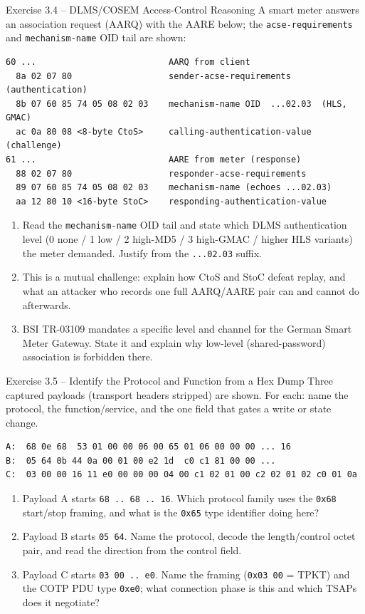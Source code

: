 \documentclass[11pt,a4paper]{article}
\begin{document}
\begin{taskbox}{Exercise 3.4 -- DLMS/COSEM Access-Control Reasoning}
A smart meter answers an association request (AARQ) with the AARE below; the
\texttt{acse-requirements} and \texttt{mechanism-name} OID tail are shown:
\begin{lstlisting}[language={}]
60 ...                          AARQ from client
  8a 02 07 80                   sender-acse-requirements (authentication)
  8b 07 60 85 74 05 08 02 03    mechanism-name OID  ...02.03  (HLS, GMAC)
  ac 0a 80 08 <8-byte CtoS>     calling-authentication-value (challenge)
61 ...                          AARE from meter (response)
  88 02 07 80                   responder-acse-requirements
  89 07 60 85 74 05 08 02 03    mechanism-name (echoes ...02.03)
  aa 12 80 10 <16-byte StoC>    responding-authentication-value
\end{lstlisting}
\begin{enumerate}
  \item Read the \texttt{mechanism-name} OID tail and state which DLMS
        authentication level (0 none / 1 low / 2 high-MD5 / 3 high-GMAC /
        higher HLS variants) the meter demanded. Justify from the
        \texttt{...02.03} suffix.
  \item This is a mutual challenge: explain how CtoS and StoC defeat replay,
        and what an attacker who records one full AARQ/AARE pair can and
        cannot do afterwards.
  \item BSI TR-03109 mandates a specific level and channel for the German
        Smart Meter Gateway. State it and explain why low-level
        (shared-password) association is forbidden there.
\end{enumerate}
\end{taskbox}

\begin{taskbox}{Exercise 3.5 -- Identify the Protocol and Function from a Hex Dump}
Three captured payloads (transport headers stripped) are shown. For each:
name the protocol, the function/service, and the one field that gates a
write or state change.
\begin{lstlisting}[language={}]
A:  68 0e 68  53 01 00 00 06 00 65 01 06 00 00 00 ... 16
B:  05 64 0b 44 0a 00 01 00 e2 1d  c0 c1 81 00 00 ...
C:  03 00 00 16 11 e0 00 00 00 04 00 c1 02 01 00 c2 02 01 02 c0 01 0a
\end{lstlisting}
\begin{enumerate}
  \item Payload A starts \texttt{68 .. 68 .. 16}. Which protocol family uses
        the \texttt{0x68} start/stop framing, and what is the \texttt{0x65}
        type identifier doing here?
  \item Payload B starts \texttt{05 64}. Name the protocol, decode the
        length/control octet pair, and read the direction from the control
        field.
  \item Payload C starts \texttt{03 00 .. e0}. Name the framing
        (\texttt{0x03 00} = TPKT) and the COTP PDU type \texttt{0xe0}; what
        connection phase is this and which TSAPs does it negotiate?
\end{enumerate}
\end{taskbox}
\end{document}
